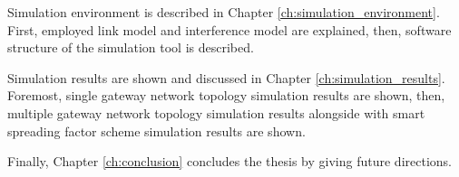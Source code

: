Simulation environment is described in Chapter \ref{ch:simulation_environment}. First, employed link model and interference model are explained, then, software structure of the simulation tool is described.

Simulation results are shown and discussed in Chapter \ref{ch:simulation_results}. Foremost, single gateway network topology simulation results are shown, then, multiple gateway network topology simulation results alongside with smart spreading factor scheme simulation results are shown. 

Finally, Chapter \ref{ch:conclusion} concludes the thesis by giving future directions.
